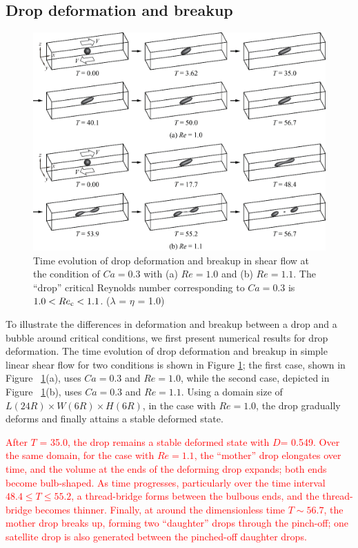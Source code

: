 \documentclass{elsarticle}
\newcommand{\lwh}[3]{L(#1R)\times W(#2R) \times H(#3R)}
\begin{document}
\subsection{Drop deformation and breakup}\label{sec:DropBreak}
% 
\begin{figure}%
  \centering
  \textcolor{red}
{
  \includegraphics[width=\textwidth]{Figure/4-DropBreakEvol}
  \caption{Time evolution of drop deformation and breakup in shear flow at the
           condition of $Ca=0.3$ with (a) $Re=1.0$ and (b) $Re=1.1$.  The
	   ``drop'' critical Reynolds number corresponding to $Ca=0.3$ is
	   $1.0<Re_{\rm c}<1.1$.
	   ($\lambda$ = $\eta$ = 1.0) \label{fig:DropBreak} }
 }
 
\end{figure}
%
To illustrate the differences in deformation and breakup between a drop and a bubble around critical conditions, we first present numerical results for drop deformation.  The time evolution of drop deformation and breakup in simple linear shear flow for two conditions is shown in Figure \ref{fig:DropBreak}; the first case, shown in Figure ~\ref{fig:DropBreak}(a), uses $Ca=0.3$ and $Re=1.0$, while the second case, depicted in Figure ~\ref{fig:DropBreak}(b), uses $Ca=0.3$ and $Re=1.1$.  Using a domain size of $\lwh{24}{6}{6}$, in the case with $Re=1.0$, the drop gradually deforms and finally attains a stable deformed state. 

\textcolor{red}
{
After $T$ = 35.0, the drop remains a stable deformed state with $D$= 0.549.  Over the same domain, for the case with $Re=1.1$, the ``mother'' drop elongates over time, and the volume at the ends of the deforming drop expands; both ends become bulb-shaped.  As time progresses, particularly over the time interval $48.4 \leq T \leq 55.2$, a thread-bridge forms between the bulbous ends, and the thread-bridge becomes thinner.  Finally, at around the dimensionless time $T\sim 56.7$, the mother drop breaks up, forming two ``daughter'' drops through the pinch-off; one satellite drop is also generated between the pinched-off daughter drops.  
}
\end{document}
